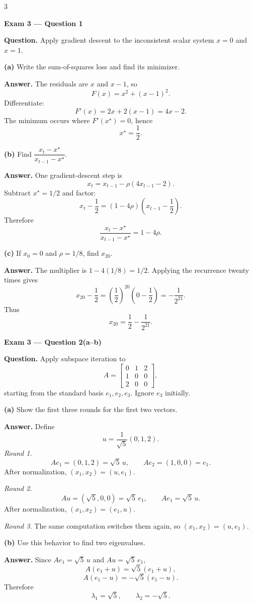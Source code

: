 \documentclass[10pt]{article}
\newcommand{\examlabel}[1]{%
  \par\noindent\textbf{#1}\par\vspace{1pt}}
\newcommand{\question}[1]{\par\noindent\textbf{Question.} #1\par}
\newcommand{\answer}{\par\noindent\textbf{Answer.} }
\begin{document}
\begin{multicols*}{3}

\examlabel{Exam 3 --- Question 1}
\question{Apply gradient descent to the inconsistent scalar system
$x=0$ and $x=1$.}

\textbf{(a)} Write the sum-of-squares loss and find its minimizer.

\answer The residuals are $x$ and $x-1$, so
\[
  F(x)=x^2+(x-1)^2.
\]
Differentiate:
\[
  F'(x)=2x+2(x-1)=4x-2.
\]
The minimum occurs where $F'(x^\star)=0$, hence
\[
  \boxed{x^\star=\frac12}.
\]

\textbf{(b)} Find
$\dfrac{x_t-x^\star}{x_{t-1}-x^\star}$.

\answer One gradient-descent step is
\[
  x_t=x_{t-1}-\rho(4x_{t-1}-2).
\]
Subtract $x^\star=1/2$ and factor:
\[
  x_t-\frac12
  =(1-4\rho)\left(x_{t-1}-\frac12\right).
\]
Therefore
\[
  \boxed{\frac{x_t-x^\star}{x_{t-1}-x^\star}=1-4\rho}.
\]

\textbf{(c)} If $x_0=0$ and $\rho=1/8$, find $x_{20}$.

\answer The multiplier is $1-4(1/8)=1/2$. Applying the recurrence twenty
times gives
\[
  x_{20}-\frac12
  =\left(\frac12\right)^{20}
   \left(0-\frac12\right)
  =-\frac1{2^{21}}.
\]
Thus
\[
  \boxed{x_{20}=\frac12-\frac1{2^{21}}}.
\]

\examlabel{Exam 3 --- Question 2(a--b)}
\question{Apply subspace iteration to
\[
 A=
 \begin{bmatrix}
 0&1&2\\
 1&0&0\\
 2&0&0
 \end{bmatrix},
\]
starting from the standard basis $e_1,e_2,e_3$. Ignore $e_3$ initially.}

\textbf{(a)} Show the first three rounds for the first two vectors.

\answer Define
\[
  u=\frac1{\sqrt5}(0,1,2).
\]
\emph{Round 1.}
\[
  Ae_1=(0,1,2)=\sqrt5\,u,
  \qquad
  Ae_2=(1,0,0)=e_1.
\]
After normalization, $(x_1,x_2)=(u,e_1)$.

\emph{Round 2.}
\[
  Au=(\sqrt5,0,0)=\sqrt5\,e_1,
  \qquad
  Ae_1=\sqrt5\,u.
\]
After normalization, $(x_1,x_2)=(e_1,u)$.

\emph{Round 3.} The same computation switches them again, so
$(x_1,x_2)=(u,e_1)$.

\textbf{(b)} Use this behavior to find two eigenvalues.

\answer Since $Ae_1=\sqrt5\,u$ and $Au=\sqrt5\,e_1$,
\[
  A(e_1+u)=\sqrt5(e_1+u),
\]
\[
  A(e_1-u)=-\sqrt5(e_1-u).
\]
Therefore
\[
  \boxed{\lambda_1=\sqrt5,\qquad \lambda_2=-\sqrt5}.
\]


\end{multicols*}
\end{document}
